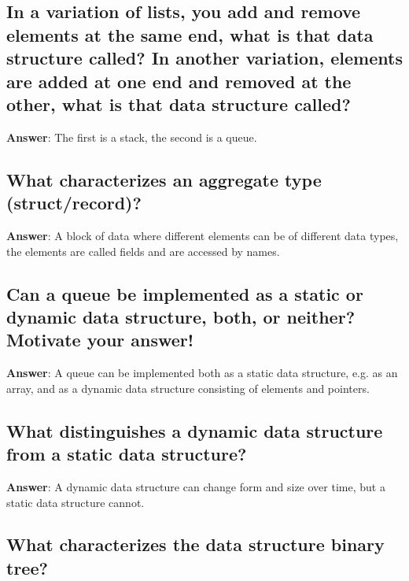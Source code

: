 \documentclass[a4paper,11pt,oneside]{article}
\begin{document}
\begin{sloppypar}
\subsection{In a variation of lists, you add and remove elements at the same end, what is that data structure called? In another variation, elements are added at one end and removed at the other, what is that data structure called?}

\label{q:266:sa:en:True}

\textbf{Answer}: The first is a stack, the second is a queue.



\subsection{What characterizes an aggregate type (struct/record)?}

\label{q:267:sa:en:True}

\textbf{Answer}: A block of data where different elements can be of different data types, the elements are called fields and are accessed by names.



\subsection{Can a queue be implemented as a static or dynamic data structure, both, or neither? Motivate your answer!}

\label{q:268:sa:en:True}

\textbf{Answer}: A queue can be implemented both as a static data structure, e.g. as an array, and as a dynamic data structure consisting of elements and pointers.



\subsection{What distinguishes a dynamic data structure from a static data structure?}

\label{q:269:sa:en:True}

\textbf{Answer}: A dynamic data structure can change form and size over time, but a static data structure cannot.



\subsection{What characterizes the data structure binary tree?}


\end{sloppypar}
\end{document}
